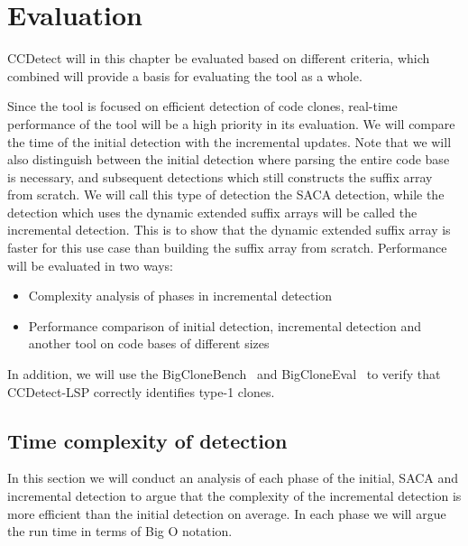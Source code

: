 \chapter{Evaluation}
\label{evaluation}


CCDetect will in this chapter be evaluated based on different criteria, which combined
will provide a basis for evaluating the tool as a whole.

Since the tool is focused on efficient detection of code clones, real-time performance of
the tool will be a high priority in its evaluation. We will compare the time of the
initial detection with the incremental updates. Note that we will also distinguish between
the initial detection where parsing the entire code base is necessary, and subsequent
detections which still constructs the suffix array from scratch. We will call this type of
detection the SACA detection, while the detection which uses the dynamic extended suffix
arrays will be called the incremental detection. This is to show that the dynamic extended
suffix array is faster for this use case than building the suffix array from scratch.
Performance will be evaluated in two ways:

\begin{itemize}
    \item Complexity analysis of phases in incremental detection
    \item Performance comparison of initial detection, incremental detection and another
        tool on code bases of different sizes
\end{itemize}

In addition, we will use the BigCloneBench~\cite{BigCloneBench} and
BigCloneEval~\cite{BigCloneEval} to verify that CCDetect-LSP correctly identifies type-1
clones.

\section{Time complexity of detection}

In this section we will conduct an analysis of each phase of the initial, SACA and
incremental detection to argue that the complexity of the incremental detection is more
efficient than the initial detection on average. In each phase we will argue the run time
in terms of Big O notation.

